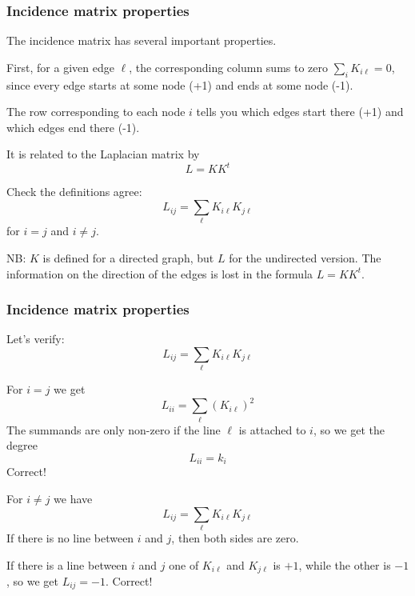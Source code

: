 \documentclass[10pt,aspectratio=169,dvipsnames]{beamer}
\begin{document}
\begin{frame}
  \frametitle{Incidence matrix properties}

  The incidence matrix has several important properties.

  First, for a given edge $\ell$, the corresponding column sums to zero $\sum_{i} K_{i\ell} = 0$, since every edge starts at some node (+1) and ends at some node (-1).

  The row corresponding to each node $i$ tells you which edges start there (+1) and which edges end there (-1).

  It is related to the Laplacian matrix by
  \begin{equation*}
    L = KK^t
  \end{equation*}

  Check the definitions agree:
  \begin{equation*}
    L_{ij} = \sum_\ell K_{i\ell}K_{j\ell}
  \end{equation*}
  for $i=j$ and $i\neq j$.

  NB: $K$ is defined for a directed graph, but $L$ for the undirected version. The information on the direction of the edges is lost in the formula $L = KK^t$.
\end{frame}



\begin{frame}
  \frametitle{Incidence matrix properties}

  Let's verify:
  \begin{equation*}
    L_{ij} = \sum_\ell K_{i\ell}K_{j\ell}
  \end{equation*}

  For $i=j$ we get
  \begin{equation*}
    L_{ii} = \sum_\ell \left(K_{i\ell}\right)^2
  \end{equation*}
  The summands are only non-zero if the line $\ell$ is attached to $i$, so we get the degree
  \begin{equation*}
    L_{ii} = k_i
  \end{equation*}
  Correct!

  For $i\neq j$ we have
  \begin{equation*}
    L_{ij} = \sum_\ell K_{i\ell}K_{j\ell}
  \end{equation*}
  If there is no line between $i$ and $j$, then both sides are zero.

  If there is a line between $i$ and $j$ one of $K_{i\ell}$ and $K_{j\ell}$ is $+1$, while the other is $-1$, so we get $L_{ij} = -1$. Correct!


\end{frame}
\end{document}
